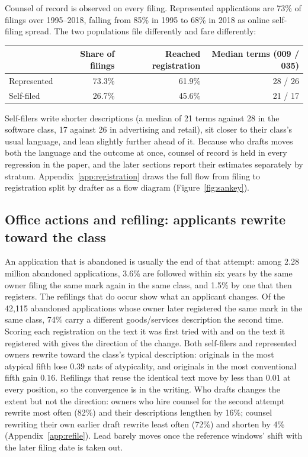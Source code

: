 Counsel of record is observed on every filing. Represented applications
are 73\% of filings over 1995--2018, falling from 85\% in 1995 to 68\% in
2018 as online self-filing spread. The two populations file differently
and fare differently:

\begin{center}\small
\begin{tabular}{lrrr}
\toprule
 & Share of filings & Reached registration & Median terms (009 / 035) \\
\midrule
Represented & 73.3\% & 61.9\% & 28 / 26 \\
Self-filed  & 26.7\% & 45.6\% & 21 / 17 \\
\bottomrule
\end{tabular}
\end{center}

\noindent Self-filers write shorter descriptions (a median of 21 terms
against 28 in the software class, 17 against 26 in advertising and
retail), sit closer to their class's usual language, and lean slightly
further ahead of it. Because who drafts moves both the language and the
outcome at once, counsel of record is held in every regression in the
paper, and the later sections report their estimates separately by
stratum. Appendix~\ref{app:registration} draws the full flow from filing
to registration split by drafter as a flow diagram
(Figure~\ref{fig:sankey}).

\subsection{Office actions and refiling: applicants rewrite toward the class}\label{sec:amend}

An application that is abandoned is usually the end of that attempt: among
2.28 million abandoned applications, 3.6\% are followed within six years
by the same owner filing the same mark again in the same class, and 1.5\%
by one that then registers. The refilings that do occur show what an
applicant changes. Of the 42{,}115 abandoned applications whose owner
later registered the same mark in the same class, 74\% carry a different
goods/services description the second time. Scoring each registration on
the text it was first tried with and on the text it registered with gives
the direction of the change. Both self-filers and represented owners
rewrite toward the class's typical description: originals in the most
atypical fifth lose $0.39$ nats of atypicality, and originals in the most
conventional fifth gain $0.16$. Refilings that reuse the identical text
move by less than $0.01$ at every position, so the convergence is in the
writing. Who drafts changes the extent but not the direction: owners who
hire counsel for the second attempt rewrite most often (82\%) and their
descriptions lengthen by 16\%; counsel rewriting their own earlier draft
rewrite least often (72\%) and shorten by 4\% (Appendix~\ref{app:refile}).
Lead barely moves once the reference windows' shift with the later filing
date is taken out.

